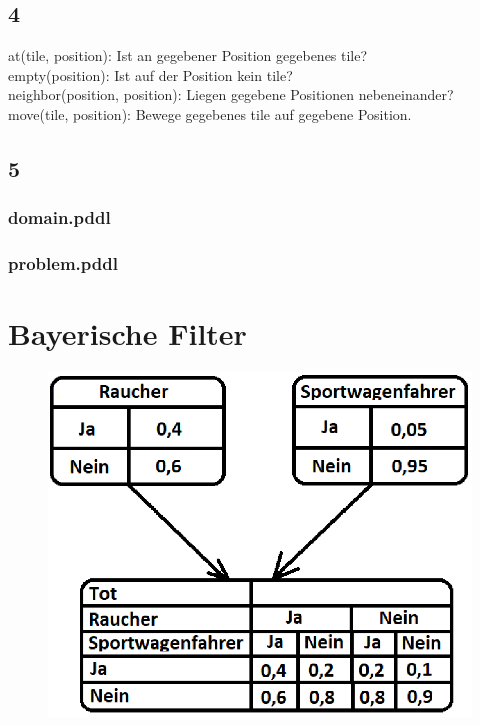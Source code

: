 \documentclass[fleqn]{scrartcl}
\begin{document}
\subsection{4}
  at(tile, position): Ist an gegebener Position gegebenes tile? \\
  empty(position): Ist auf der Position kein tile? \\
  neighbor(position, position): Liegen gegebene Positionen nebeneinander? \\
  move(tile, position): Bewege gegebenes tile auf gegebene Position. \\
\subsection{5}
\subsubsection{domain.pddl}

\subsubsection{problem.pddl}


\section{Bayerische Filter}
\begin{figure} [h!]
 \includegraphics [width = \linewidth] {a2/Bayessches_Netz.PNG}
\end{figure}
\end{document}

